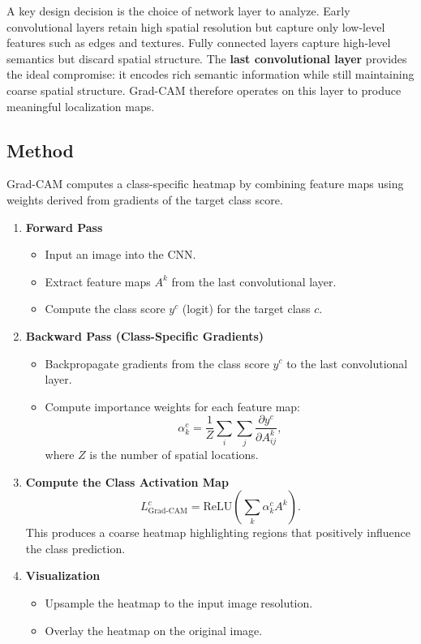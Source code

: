 \documentclass{article}
\begin{document}
A key design decision is the choice of network layer to analyze. Early
convolutional layers retain high spatial resolution but capture only low-level
features such as edges and textures. Fully connected layers capture high-level
semantics but discard spatial structure. The \textbf{last convolutional layer}
provides the ideal compromise: it encodes rich semantic information while still
maintaining coarse spatial structure. Grad-CAM therefore operates on this layer
to produce meaningful localization maps.

\subsection{Method}

Grad-CAM computes a class-specific heatmap by combining feature maps using
weights derived from gradients of the target class score.

\begin{enumerate}
  \item \textbf{Forward Pass}
  \begin{itemize}
    \item Input an image into the CNN.
    \item Extract feature maps $A^k$ from the last convolutional layer.
    \item Compute the class score $y^c$ (logit) for the target class $c$.
  \end{itemize}

  \item \textbf{Backward Pass (Class-Specific Gradients)}
  \begin{itemize}
    \item Backpropagate gradients from the class score $y^c$ to the last
    convolutional layer.
    \item Compute importance weights for each feature map:
    \[
    \alpha_k^c = \frac{1}{Z}\sum_i\sum_j
    \frac{\partial y^c}{\partial A_{ij}^k},
    \]
    where $Z$ is the number of spatial locations.
  \end{itemize}

  \item \textbf{Compute the Class Activation Map}
  \[
  L_{\text{Grad-CAM}}^c =
  \mathrm{ReLU}\left(\sum_k \alpha_k^c A^k\right).
  \]
  This produces a coarse heatmap highlighting regions that positively influence
  the class prediction.

  \item \textbf{Visualization}
  \begin{itemize}
    \item Upsample the heatmap to the input image resolution.
    \item Overlay the heatmap on the original image.
  \end{itemize}
\end{enumerate}
\end{document}

